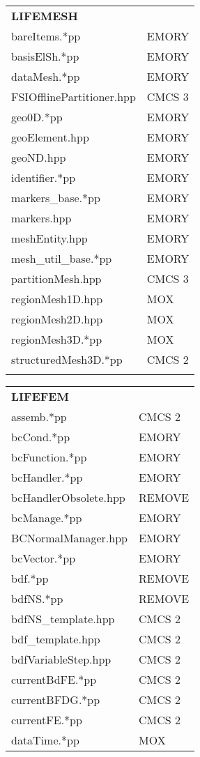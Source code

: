 \documentclass[10p]{article}
\theoremstyle{definition}
\begin{document}
\begin{landscape}
\begin{table}[!h]
\begin{multicols}{4}
\begin{xtabular}{
p{0.18\textwidth}<{}|
p{0.1\textwidth}<{}
}
\textbf{LIFEMESH} \\
bareItems.*pp & EMORY\\
basisElSh.*pp & EMORY\\
dataMesh.*pp & EMORY\\
FSIOfflinePartitioner.hpp & CMCS 3\\
geo0D.*pp & EMORY\\
geoElement.hpp & EMORY\\
geoND.hpp & EMORY\\
identifier.*pp & EMORY\\
markers\_base.*pp & EMORY\\
markers.hpp & EMORY\\
meshEntity.hpp & EMORY\\
mesh\_util\_base.*pp & EMORY\\
partitionMesh.hpp & CMCS 3\\
regionMesh1D.hpp & MOX \\
regionMesh2D.hpp & MOX\\
regionMesh3D.*pp & MOX\\
structuredMesh3D.*pp & CMCS 2\\
& \\
\end{xtabular}
\begin{xtabular}{
p{0.18\textwidth}<{}|
p{0.1\textwidth}<{}
}
\textbf{LIFEFEM} \\
assemb.*pp & CMCS 2\\
bcCond.*pp & EMORY\\
bcFunction.*pp & EMORY\\
bcHandler.*pp & EMORY\\
bcHandlerObsolete.hpp & REMOVE\\
bcManage.*pp & EMORY\\
BCNormalManager.hpp & EMORY\\
bcVector.*pp & EMORY\\
bdf.*pp & REMOVE\\
bdfNS.*pp & REMOVE\\
bdfNS\_template.hpp & CMCS 2\\
bdf\_template.hpp & CMCS 2\\
bdfVariableStep.hpp & CMCS 2\\
currentBdFE.*pp & CMCS 2\\
currentBFDG.*pp & CMCS 2\\
currentFE.*pp & CMCS 2\\
dataTime.*pp & MOX\\

\end{xtabular}
\end{multicols}
\end{table}
\end{landscape}
\end{document}
